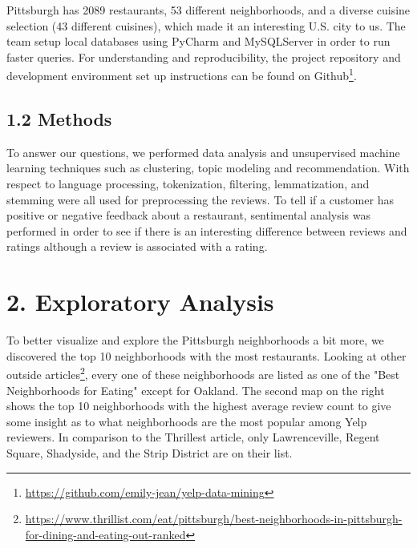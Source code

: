 \documentclass{neu_handout}
\begin{document}
\begin{figure}[h]
\centering
{}
\end{figure}

Pittsburgh has 2089 restaurants, 53 different neighborhoods, and a diverse cuisine selection (43 different cuisines), which made it an interesting U.S. city to us.
The team setup local databases using PyCharm and MySQLServer in order to run faster queries. For understanding and reproducibility, the project repository and development environment set up instructions can be found on Github\footnote{\url{https://github.com/emily-jean/yelp-data-mining}}.

\subsection*{1.2 Methods}
To answer our questions, we performed data analysis and unsupervised machine learning techniques such as clustering, topic modeling and recommendation. With respect to language processing, tokenization, filtering, lemmatization, and stemming were all used for preprocessing the reviews. To tell if a customer has positive or negative feedback about a restaurant, sentimental analysis was performed in order to see if there is an interesting difference between reviews and ratings although a review is associated with a rating.

\section*{2. Exploratory Analysis}
To better visualize and explore the Pittsburgh neighborhoods a bit more, we discovered the top 10 neighborhoods with the most restaurants. Looking at other outside articles\footnote{\url{https://www.thrillist.com/eat/pittsburgh/best-neighborhoods-in-pittsburgh-for-dining-and-eating-out-ranked}}, every one of these neighborhoods are listed as one of the "Best Neighborhoods for Eating" except for Oakland. The second map on the right shows the top 10 neighborhoods with the highest average review count to give some insight as to what neighborhoods are the most popular among Yelp reviewers. In comparison to the Thrillest article, only Lawrenceville, Regent Square, Shadyside, and the Strip District are on their list.
\end{document}
